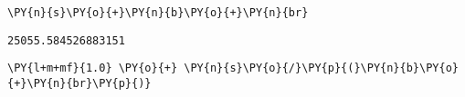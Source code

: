 
{\par%
\vspace{-1\baselineskip}%
}%
\begin{notebookcell}[]%
\begin{addmargin}[\cellleftmargin]{0em}%
{\smaller%
\par%
%
\vspace{-1\smallerfontscale}%
\begin{Verbatim}[commandchars=\\\{\}]
\PY{n}{s}\PY{o}{+}\PY{n}{b}\PY{o}{+}\PY{n}{br}
\end{Verbatim}
%
\par%
\vspace{-1\smallerfontscale}}%
\end{addmargin}
\end{notebookcell}

\par\vspace{1\smallerfontscale}%
    \begin{addmargin}[\cellleftmargin]{0em}%
    {\smaller%
    \vspace{-1\smallerfontscale}%
    
    
    
    \begin{verbatim}
25055.584526883151
    \end{verbatim}

    
}%
    \end{addmargin}%

{\par%
\vspace{-1\baselineskip}%
}%
\begin{notebookcell}[]%
\begin{addmargin}[\cellleftmargin]{0em}%
{\smaller%
\par%
%
\vspace{-1\smallerfontscale}%
\begin{Verbatim}[commandchars=\\\{\}]
\PY{l+m+mf}{1.0} \PY{o}{+} \PY{n}{s}\PY{o}{/}\PY{p}{(}\PY{n}{b}\PY{o}{+}\PY{n}{br}\PY{p}{)}
\end{Verbatim}
%
\par%
\vspace{-1\smallerfontscale}}%
\end{addmargin}
\end{notebookcell}

